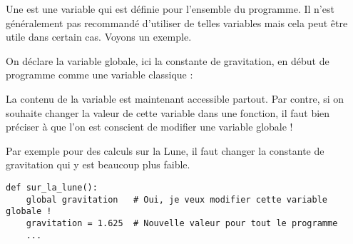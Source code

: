 \documentclass[11pt,class=report,crop=false]{standalone}
\begin{document}


\begin{cours}


Une  est une variable qui est définie pour l'ensemble du programme. Il n'est généralement pas recommandé d'utiliser de telles variables mais cela peut être utile dans certain cas. Voyons un exemple.

On déclare la variable globale, ici la constante de gravitation, en début de programme comme une variable classique : \\
\centerline{}

La contenu de la variable  est maintenant accessible partout.
Par contre, si on souhaite changer la valeur de cette variable dans une fonction, il faut bien préciser à \Python{} que l'on est conscient de modifier une variable globale !

Par exemple pour des calculs sur la Lune, il faut changer la constante de gravitation qui y est beaucoup plus faible.

\begin{lstlisting}
def sur_la_lune():
    global gravitation   # Oui, je veux modifier cette variable globale !
    gravitation = 1.625  # Nouvelle valeur pour tout le programme    
    ...
\end{lstlisting}

\end{cours}


\end{document}
